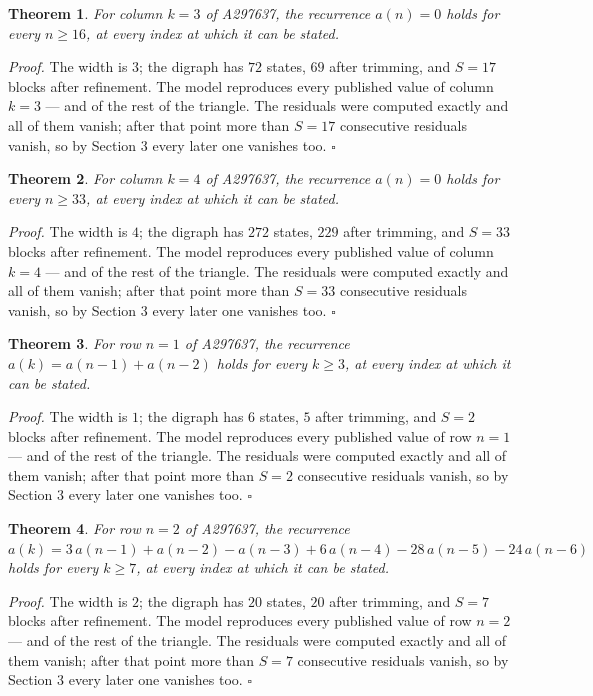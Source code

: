\documentclass[11pt]{article}
\newtheorem{theorem}{Theorem}
\theoremstyle{definition}
\begin{document}
\begin{theorem} For column $k = 3$ of A297637, the recurrence $a(n) = 0$ holds for every $n \ge 16$, at every index at which it can be stated.\end{theorem}

{\itshape Proof.} The width is $3$; the digraph has $72$ states, $69$ after trimming, and $S = 17$ blocks after refinement. The model reproduces every published value of column $k = 3$ --- and of the rest of the triangle. The residuals were computed exactly and all of them vanish; after that point more than $S = 17$ consecutive residuals vanish, so by Section 3 every later one vanishes too. $\square$

\begin{theorem} For column $k = 4$ of A297637, the recurrence $a(n) = 0$ holds for every $n \ge 33$, at every index at which it can be stated.\end{theorem}

{\itshape Proof.} The width is $4$; the digraph has $272$ states, $229$ after trimming, and $S = 33$ blocks after refinement. The model reproduces every published value of column $k = 4$ --- and of the rest of the triangle. The residuals were computed exactly and all of them vanish; after that point more than $S = 33$ consecutive residuals vanish, so by Section 3 every later one vanishes too. $\square$

\begin{theorem} For row $n = 1$ of A297637, the recurrence $a(k) = a(n-1) + a(n-2)$ holds for every $k \ge 3$, at every index at which it can be stated.\end{theorem}

{\itshape Proof.} The width is $1$; the digraph has $6$ states, $5$ after trimming, and $S = 2$ blocks after refinement. The model reproduces every published value of row $n = 1$ --- and of the rest of the triangle. The residuals were computed exactly and all of them vanish; after that point more than $S = 2$ consecutive residuals vanish, so by Section 3 every later one vanishes too. $\square$

\begin{theorem} For row $n = 2$ of A297637, the recurrence $a(k) = 3\,a(n-1) + a(n-2) - a(n-3) + 6\,a(n-4) - 28\,a(n-5) - 24\,a(n-6)$ holds for every $k \ge 7$, at every index at which it can be stated.\end{theorem}

{\itshape Proof.} The width is $2$; the digraph has $20$ states, $20$ after trimming, and $S = 7$ blocks after refinement. The model reproduces every published value of row $n = 2$ --- and of the rest of the triangle. The residuals were computed exactly and all of them vanish; after that point more than $S = 7$ consecutive residuals vanish, so by Section 3 every later one vanishes too. $\square$
\end{document}
